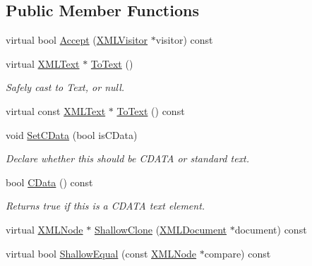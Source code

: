 \subsection*{Public Member Functions}
\begin{DoxyCompactItemize}
\item 
virtual bool \hyperlink{classtinyxml2_1_1_x_m_l_text_a537c60d7e18fb59c45ac2737a29ac47a}{Accept} (\hyperlink{classtinyxml2_1_1_x_m_l_visitor}{X\+M\+L\+Visitor} $\ast$visitor) const
\item 
virtual \hyperlink{classtinyxml2_1_1_x_m_l_text}{X\+M\+L\+Text} $\ast$ \hyperlink{classtinyxml2_1_1_x_m_l_text_ab1213b4ddebe9b17ec7e7040e9f1caf7}{To\+Text} ()
\begin{DoxyCompactList}\small\item\em Safely cast to Text, or null. \end{DoxyCompactList}\item 
virtual const \hyperlink{classtinyxml2_1_1_x_m_l_text}{X\+M\+L\+Text} $\ast$ \hyperlink{classtinyxml2_1_1_x_m_l_text_a671ce22c7c5ef378f1ce31e6f827b9e2}{To\+Text} () const
\item 
void \hyperlink{classtinyxml2_1_1_x_m_l_text_ad080357d76ab7cc59d7651249949329d}{Set\+C\+Data} (bool is\+C\+Data)
\begin{DoxyCompactList}\small\item\em Declare whether this should be C\+D\+A\+TA or standard text. \end{DoxyCompactList}\item 
bool \hyperlink{classtinyxml2_1_1_x_m_l_text_ac1bb5ea4166c320882d9e0ad16fd385b}{C\+Data} () const
\begin{DoxyCompactList}\small\item\em Returns true if this is a C\+D\+A\+TA text element. \end{DoxyCompactList}\item 
virtual \hyperlink{classtinyxml2_1_1_x_m_l_node}{X\+M\+L\+Node} $\ast$ \hyperlink{classtinyxml2_1_1_x_m_l_text_a86d265c93152726c8c6831e9594840e6}{Shallow\+Clone} (\hyperlink{classtinyxml2_1_1_x_m_l_document}{X\+M\+L\+Document} $\ast$document) const
\item 
virtual bool \hyperlink{classtinyxml2_1_1_x_m_l_text_a99d8bce4dc01df889126e047f358cdfc}{Shallow\+Equal} (const \hyperlink{classtinyxml2_1_1_x_m_l_node}{X\+M\+L\+Node} $\ast$compare) const
\end{DoxyCompactItemize}
